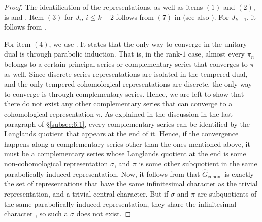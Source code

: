 \documentclass[12pt,reqno]{amsart}
\theoremstyle{definition}
\begin{document}
\begin{proof}
    The identification of the representations, as well as items $(1)$ and $(2)$, is \cite[VI.4.4]{BorelWallach} and \cite[Theorem~4.5]{BorelWallach}. Item $(3)$ for $J_i$, $i \leq k-2$ follows from $(7)$ in \cite[VI.4.2]{BorelWallach} (see also \cite[VI.4.6]{BorelWallach}). For $J_{k-1}$, it follows from \cite[VI.1.7]{BorelWallach}.
    
    For item $(4)$, we use \cite[Theorem~3]{voganIsol}. It states that the only way to converge in the unitary dual is through parabolic induction. That is, in the rank-$1$ case, almost every $\pi_n$ belongs to a certain principal series or complementary series that converges to $\pi$ as well. Since discrete series representations are isolated in the tempered dual, and the only tempered cohomological representations are discrete, the only way to converge is through complementary series. Hence, we are left to show that there do not exist any other complementary series that can converge to a cohomological representation $\pi$. As explained in the discussion in the last paragraph of \S\ref{subsec:6.1}, every complementary series can be identified by the Langlands quotient that appears at the end of it. Hence, if the convergence happens along a complementary series other than the ones mentioned above, it must be a complementary series whose Langlands quotient at the end is some non-cohomological representation $\sigma$, and $\pi$ is some other subquotient in the same parabolically induced representation. Now, it follows from \cite[Theorems~VI.3.2-VI.3.4]{BorelWallach} that $\widehat{G}_\mathrm{cohom}$ is exactly the set of representations that have the same infinitesimal character as the trivial representation, and a trivial central character. But if $\sigma$ and $\pi$ are subquotients of the same parabolically induced representation, they share the infinitesimal character \cite[III.3.2]{BorelWallach}, so such a $\sigma$ does not exist.
\end{proof}
\end{document}
